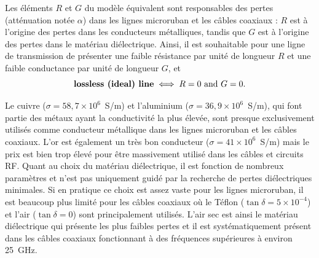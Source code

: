 \begin{prop}
  Les éléments $R$ et $G$ du modèle équivalent sont responsables des pertes
  (atténuation notée $\alpha$) dans les lignes microruban et les câbles
  coaxiaux : $R$ est à l'origine des pertes dans les conducteurs métalliques,
  tandis que $G$ est à l'origine des pertes dans le matériau diélectrique.
  Ainsi, il est souhaitable pour une ligne de transmission de présenter une
  faible résistance par unité de longueur $R$ et une faible conductance par
  unité de longueur $G$, et
  \[\text{\textbf{lossless (ideal) line}} \iff R = 0 \text{ and } G = 0.\]
\end{prop}

\begin{remark}
  Le cuivre ($\sigma = 58{,}7\times 10^{6}$~S/m) et l'aluminium
  ($\sigma = 36{,}9 \times 10^{6}$~S/m), qui font partie des métaux ayant la
  conductivité la plus élevée, sont presque exclusivement utilisés comme
  conducteur métallique dans les lignes microruban et les câbles coaxiaux. L'or
  est également un très bon conducteur ($\sigma = 41 \times 10^{6}$~S/m) mais
  le prix est bien trop élevé pour être massivement utilisé dans les câbles et
  circuits RF. Quant au choix du matériau diélectrique, il est fonction de
  nombreux paramètres et n'est pas uniquement guidé par la recherche de pertes
  diélectriques minimales. Si en pratique ce choix est assez vaste pour les
  lignes microruban, il est beaucoup plus limité pour les câbles coaxiaux où le
  Téflon ($\tan\delta = 5\times 10^{-4}$) et l'air ($\tan\delta = 0$) sont
  principalement utilisés. L'air sec est ainsi le matériau diélectrique qui
  présente les plus faibles pertes et il est systématiquement présent dans les
  câbles coaxiaux fonctionnant à des fréquences supérieures à environ 25~GHz.
\end{remark}


